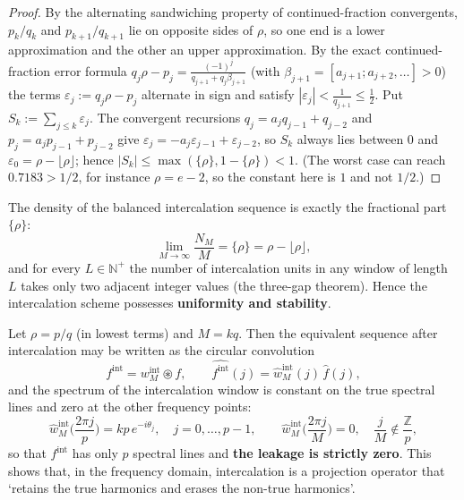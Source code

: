 \begin{proof}
By the alternating sandwiching property of continued-fraction convergents, $p_k/q_k$ and $p_{k+1}/q_{k+1}$ lie on opposite sides of $\rho$, so one end is a lower approximation and the other an upper approximation. By the exact continued-fraction error formula $q_j\rho-p_j=\frac{(-1)^j}{q_{j+1}+q_j\beta_{j+1}}$ (with $\beta_{j+1}=[a_{j+1};a_{j+2},\dots]>0$) the terms $\varepsilon_j:=q_j\rho-p_j$ alternate in sign and satisfy $|\varepsilon_j|<\frac1{q_{j+1}}\le\frac12$. Put $S_k:=\sum_{j\le k}\varepsilon_j$. The convergent recursions $q_j=a_jq_{j-1}+q_{j-2}$ and $p_j=a_jp_{j-1}+p_{j-2}$ give $\varepsilon_j=-a_j\varepsilon_{j-1}+\varepsilon_{j-2}$, so $S_k$ always lies between $0$ and $\varepsilon_0=\rho-\lfloor\rho\rfloor$; hence $|S_k|\le\max(\{\rho\},1-\{\rho\})<1$. (The worst case can reach $0.7183>1/2$, for instance $\rho=e-2$, so the constant here is $1$ and not $1/2$.)
\end{proof}

\begin{property}\label{prop:intercalation_density_property}
The density of the balanced intercalation sequence is exactly the fractional part $\{\rho\}$:
\[
\lim_{M\to\infty}\frac{N_M}{M}=\{\rho\}=\rho-\lfloor\rho\rfloor,
\]
and for every $L\in\mathbb{N}^+$ the number of intercalation units in any window of length $L$ takes only two adjacent integer values (the three-gap theorem). Hence the intercalation scheme possesses \textbf{uniformity and stability}.
\end{property}

\begin{theorem}\label{thm:intercalation_circular_convolution}
Let $\rho=p/q$ (in lowest terms) and $M=kq$. Then the equivalent sequence after intercalation may be written as the circular convolution
\[
f^{\mathrm{int}}=w^{\mathrm{int}}_M\circledast f,
\qquad
\widehat{f^{\mathrm{int}}}(j)=\hat w^{\mathrm{int}}_M(j)\,\hat f(j),
\]
and the spectrum of the intercalation window is constant on the true spectral lines and zero at the other frequency points:
\[
\hat w^{\mathrm{int}}_M\Big(\frac{2\pi j}{p}\Big)=kp\,e^{-i\theta_j},\quad j=0,\dots,p-1,
\qquad
\hat w^{\mathrm{int}}_M\Big(\frac{2\pi j}{M}\Big)=0,\quad \frac{j}{M}\notin\frac{\mathbb{Z}}{p},
\]
so that $f^{\mathrm{int}}$ has only $p$ spectral lines and \textbf{the leakage is strictly zero}. This shows that, in the frequency domain, intercalation is a projection operator that `retains the true harmonics and erases the non-true harmonics'.
\end{theorem}

